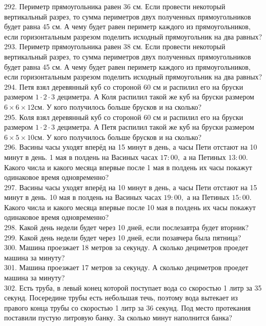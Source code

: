 292. Периметр прямоугольника равен 36 см. Если провести некоторый вертикальный разрез, то сумма периметров двух полученных прямоугольников будет равна 45 см. А чему будет равен периметр каждого из прямоугольников, если горизонтальным разрезом поделить исходный прямоугольник на два равных?\\
293. Периметр прямоугольника равен 38 см. Если провести некоторый вертикальный разрез, то сумма периметров двух полученных прямоугольников будет равна 45 см. А чему будет равен периметр каждого из прямоугольников, если горизонтальным разрезом поделить исходный прямоугольник на два равных?\\
294. Петя взял деревянный куб со стороной 60 см и распилил его на бруски размером $1\cdot2\cdot3$ дециметра. А Коля распилил такой же куб на бруски размером $6\times6\times12$см. У кого получилось больше брусков и на сколько?\\
295. Коля взял деревянный куб со стороной 60 см и распилил его на бруски размером $1\cdot2\cdot3$ дециметра. А Петя распилил такой же куб на бруски размером $6\times5\times10$см. У кого получилось больше брусков и на сколько?\\
296. Васины часы уходят вперёд на 15 минут в день, а часы Пети отстают на 10 минут в день. 1 мая в полдень на Васиных часах $17:00,$ а на Петиных $13:00.$ Какого числа и какого месяца впервые после 1 мая в полдень их часы покажут одинаковое время одновременно?\\
297. Васины часы уходят вперёд на 10 минут в день, а часы Пети отстают на 15 минут в день. 10 мая в полдень на Васиных часах $19:00,$ а на Петиных $15:00.$ Какого числа и какого месяца впервые после 10 мая в полдень их часы покажут одинаковое время одновременно?\\
298. Какой день недели будет через 10 дней, если послезавтра будет вторник?\\
299. Какой день недели будет через 10 дней, если позавчера была пятница?\\
300. Машина проезжает 18 метров за секунду. А сколько дециметров проедет машина за минуту?\\
301. Машина проезжает 17 метров за секунду. А сколько дециметров проедет машина за минуту?\\
302. Есть труба, в левый конец которой поступает вода со скоростью 1 литр за 35 секунд. Посередине трубы есть небольшая течь, поэтому вода вытекает из правого конца трубы со скоростью 1 литр за 36 секунд. Под место протекания поставили пустую литровую банку. За сколько минут наполнится банка?\\
